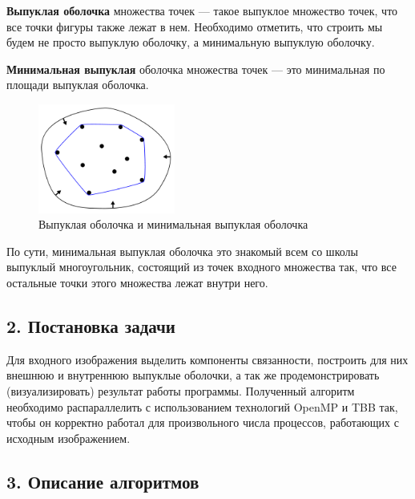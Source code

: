 \documentclass{report}
\begin{document}
\par \textbf{Выпуклая оболочка} множества точек — такое выпуклое множество точек, что все точки фигуры также лежат в нем. Необходимо отметить, что строить мы будем не просто выпуклую оболочку, а минимальную выпуклую оболочку.
\par \textbf{Минимальная выпуклая} оболочка множества точек — это минимальная по площади выпуклая оболочка.
\begin{figure}[htbp]
  \centering
  \includegraphics[width=0.4\textwidth]{2 Convex Hull}
  \caption{Выпуклая оболочка и минимальная выпуклая оболочка}\label{fig:2 Convex Hull}
\end{figure}
\par По сути, минимальная выпуклая оболочка это знакомый всем со школы выпуклый многоугольник, состоящий из точек входного множества так, что все остальные точки этого множества лежат внутри него.
 
\newpage


\begin{center}
\section*{2. Постановка задачи}
\end{center}
\par Для входного изображения выделить компоненты связанности, построить для них внешнюю и внутреннюю выпуклые оболочки, а так же продемонстрировать (визуализировать) результат работы программы. Полученный алгоритм необходимо распараллелить с использованием технологий OpenMP и TBB так, чтобы он корректно работал для произвольного числа процессов, работающих с исходным изображением.

\newpage


\begin{center}
\section*{3. Описание алгоритмов}
\end{center}
\end{document}
